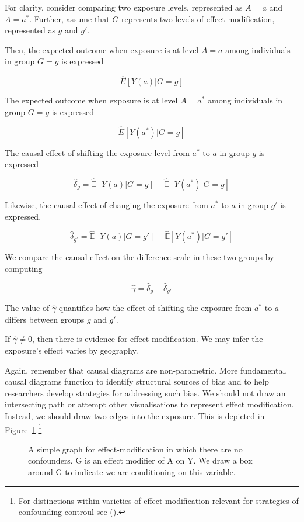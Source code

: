 \documentclass[
  singlecolumn]{article}
\begin{document}
For clarity, consider comparing two exposure levels, represented as
\(A = a\) and \(A= a^*\). Further, assume that \(G\) represents two
levels of effect-modification, represented as \(g\) and \(g'\).

Then, the expected outcome when exposure is at level \(A=a\) among
individuals in group \(G=g\) is expressed

\[\hat{E}[Y(a)|G=g]\]

The expected outcome when exposure is at level \(A=a^*\) among
individuals in group \(G=g\) is expressed

\[\hat{E}[Y(a^*)|G=g]\]

The causal effect of shifting the exposure level from \(a^*\) to \(a\)
in group \(g\) is expressed

\[\hat{\delta}_g = \hat{\mathbb{E}}[Y(a)|G=g] - \hat{\mathbb{E}}[Y(a^*)|G=g]\]

Likewise, the causal effect of changing the exposure from \(a^*\) to
\(a\) in group \(g'\) is expressed.

\[\hat{\delta}_{g'} = \hat{\mathbb{E}}[Y(a)|G=g'] - \hat{\mathbb{E}}[Y(a^*)|G=g']\]

We compare the causal effect on the difference scale in these two groups
by computing

\[\hat{\gamma} = \hat{\delta}_g - \hat{\delta}_{g'}\]

The value of \(\hat{\gamma}\) quantifies how the effect of shifting the
exposure from \(a^*\) to \(a\) differs between groups \(g\) and \(g'\).

If \(\hat{\gamma}\neq 0\), then there is evidence for effect
modification. We may infer the exposure's effect varies by geography.

Again, remember that causal diagrams are non-parametric. More
fundamental, causal diagrams function to identify structural sources of
bias and to help researchers develop strategies for addressing such
bias. We should not draw an intersecting path or attempt other
visualisations to represent effect modification. Instead, we should draw
two edges into the exposure. This is depicted in
Figure~\ref{fig-dag-effect-modfication}.\footnote{For distinctions
  within varieties of effect modification relevant for strategies of
  confounding controul see ().}

\begin{figure}


\caption{\label{fig-dag-effect-modfication}A simple graph for
effect-modification in which there are no confounders. G is an effect
modifier of A on Y. We draw a box around G to indicate we are
conditioning on this variable.}

\end{figure}%
\end{document}
